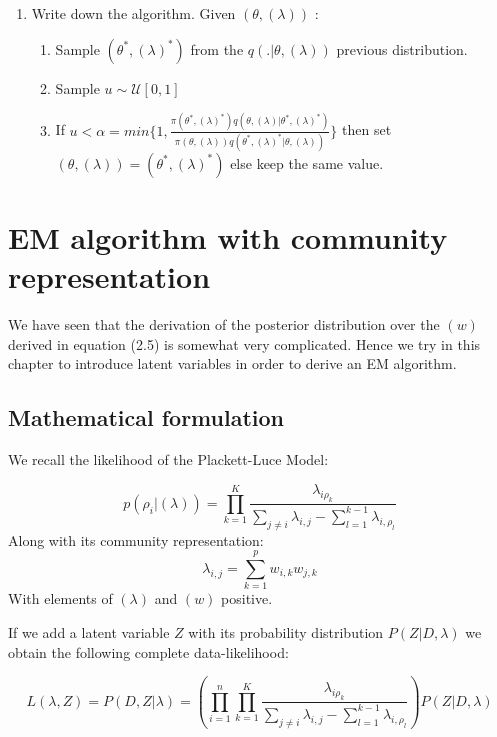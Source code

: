 \documentclass[12pt]{ociamthesis}  %
\begin{document}
\begin{enumerate}
	\item Write down the algorithm. Given $(\theta, (\lambda))$ :
	\begin{enumerate}
	\item Sample $(\theta^{*}, (\lambda)^{*})$ from the $q(.|\theta, (\lambda))$ previous distribution.
	\item Sample $u \sim \mathcal{U}[0,1]$
	\item If $u < \alpha = min\{ 1, \frac{\pi(\theta^{*}, (\lambda)^{*})q(\theta, (\lambda) |\theta^{*}, (\lambda)^{*})}{\pi(\theta, (\lambda))q(\theta^{*}, (\lambda)^{*} |\theta, (\lambda))}   \}$ then set $(\theta, (\lambda)) = (\theta^{*}, (\lambda)^{*})$ else keep the same value.
	\end{enumerate}
	\end{enumerate}
	\chapter{EM algorithm with community representation}
	
	We have seen that the derivation of the posterior distribution over the $(w)$ derived in equation (2.5) is somewhat very complicated. Hence we try in this chapter to introduce latent variables in order to derive an EM algorithm.
	
	\section{Mathematical formulation}
	
	We recall the likelihood of the Plackett-Luce Model:
	
	\begin{equation}
	p(\rho_{i} | (\lambda)) = \prod_{k = 1}^{K}\frac{\lambda_{i\rho_{k}}}{\sum_{j \neq i}\lambda_{i,j} - \sum_{l = 1}^{k - 1}\lambda_{i,\rho_{l}}}
	\end{equation}
	Along with its community representation:
	\begin{equation}
	\lambda_{i,j} = \sum_{k = 1}^{p} w_{i,k} w_{j,k}
	\end{equation}
	With elements of $(\lambda)$ and $(w)$ positive.
	
	If we add a latent variable $Z$ with its probability distribution $P(Z | D, \lambda)$ we obtain the following complete data-likelihood:
	
	\begin{equation}
	L(\lambda,Z) = P(D,Z | \lambda) = (\prod_{i = 1}^{n}\prod_{k = 1}^{K}\frac{\lambda_{i\rho_{k}}}{\sum_{j \neq i}\lambda_{i,j} - \sum_{l = 1}^{k - 1}\lambda_{i,\rho_{l}}})P(Z | D, \lambda)
	\end{equation}
	
\end{document}
